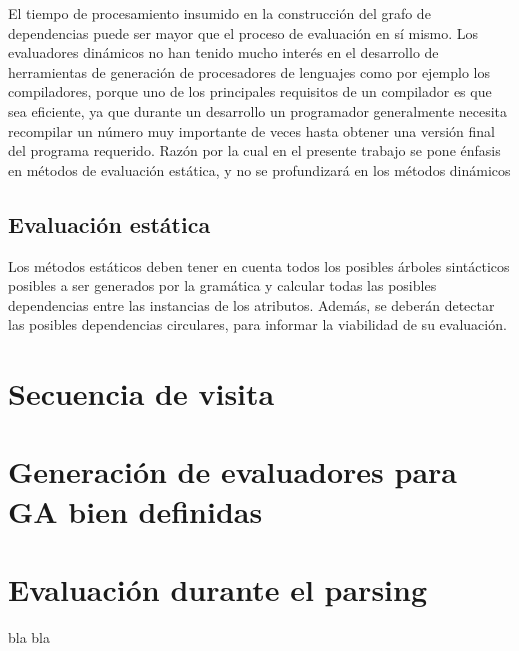 El tiempo de procesamiento insumido en la construcción del grafo de dependencias puede ser mayor que el proceso de evaluación en sí mismo. Los evaluadores dinámicos no han tenido mucho interés en el desarrollo de herramientas de generación de procesadores de lenguajes como por ejemplo los compiladores, porque uno de los principales requisitos de un compilador es que sea eficiente, ya que durante un desarrollo un programador generalmente necesita recompilar un número muy importante de veces hasta obtener una versión final del programa requerido.
Razón por la cual en el presente trabajo se pone énfasis en métodos de evaluación estática, y no se profundizará en los métodos dinámicos


\subsection{Evaluación estática}
Los métodos estáticos deben tener en cuenta todos los posibles árboles sintácticos posibles a ser generados por la gramática y calcular todas las posibles dependencias entre las instancias de los atributos. Además, se deberán detectar las posibles dependencias circulares, para informar la viabilidad de su evaluación.


\section{Secuencia de visita}
\section{Generación de evaluadores para GA bien definidas}
\section{Evaluación durante el parsing}

bla bla

